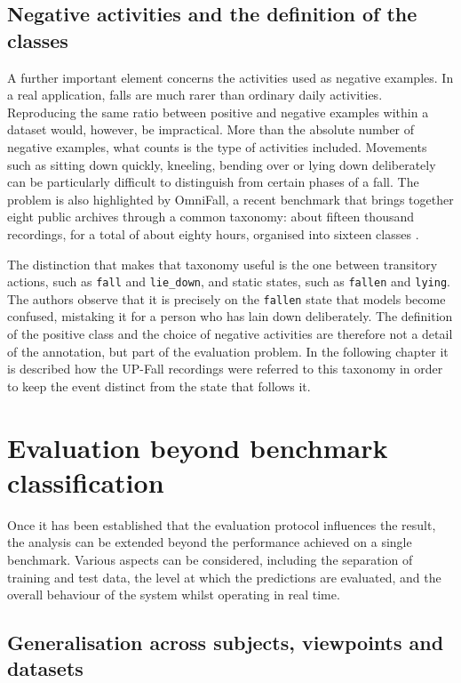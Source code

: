 \subsection{Negative activities and the definition of the classes}

A further important element concerns the activities used as negative examples.
In a real application, falls are much rarer than ordinary daily activities. Reproducing the same ratio between positive and negative examples within a dataset would, however, be impractical.
More than the absolute number of negative examples, what counts is the type of activities included. Movements such as sitting down quickly, kneeling, bending over or lying down deliberately can be particularly difficult to distinguish from certain phases of a fall. The problem is also highlighted by OmniFall, a recent benchmark that brings together eight public archives through a common taxonomy: about fifteen thousand recordings, for a total of about eighty hours, organised into sixteen classes \cite{SN}.

The distinction that makes that taxonomy useful is the one between transitory actions, such as \texttt{fall} and \texttt{lie\_down}, and static states, such as \texttt{fallen} and \texttt{lying}. The authors observe that it is precisely on the \texttt{fallen} state that models become confused, mistaking it for a person who has lain down deliberately. The definition of the positive class and the choice of negative activities are therefore not a detail of the annotation, but part of the evaluation problem. In the following chapter it is described how the UP-Fall recordings were referred to this taxonomy in order to keep the event distinct from the state that follows it.

\section{Evaluation beyond benchmark classification}

Once it has been established that the evaluation protocol influences the result, the analysis can be extended beyond the performance achieved on a single benchmark. Various aspects can be considered, including the separation of training and test data, the level at which the predictions are evaluated, and the overall behaviour of the system whilst operating in real time.

\subsection{Generalisation across subjects, viewpoints and datasets}

